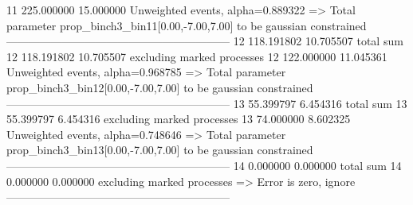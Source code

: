 11         225.000000      15.000000       Unweighted events, alpha=0.889322
  => Total parameter prop_binch3_bin11[0.00,-7.00,7.00] to be gaussian constrained
------------------------------------------------------------
12         118.191802      10.705507       total sum                     
12         118.191802      10.705507       excluding marked processes    
12         122.000000      11.045361       Unweighted events, alpha=0.968785
  => Total parameter prop_binch3_bin12[0.00,-7.00,7.00] to be gaussian constrained
------------------------------------------------------------
13         55.399797       6.454316        total sum                     
13         55.399797       6.454316        excluding marked processes    
13         74.000000       8.602325        Unweighted events, alpha=0.748646
  => Total parameter prop_binch3_bin13[0.00,-7.00,7.00] to be gaussian constrained
------------------------------------------------------------
14         0.000000        0.000000        total sum                     
14         0.000000        0.000000        excluding marked processes    
  => Error is zero, ignore      
------------------------------------------------------------
